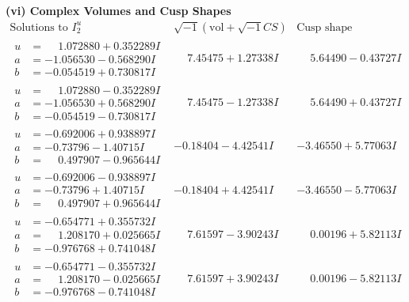 \documentclass[1p]{elsarticle_modified}
\theoremstyle{definition}
\newcommand{\I}{\sqrt{-1}}
\begin{document}
\newpage\flushleft \textbf{(vi) Complex Volumes and Cusp Shapes}
$$\begin{array}{c|c|c}  
\text{Solutions to }I^u_{2}& \I (\text{vol} + \sqrt{-1}CS) & \text{Cusp shape}\\
 \hline 
\begin{aligned}
u &= \phantom{-}1.072880 + 0.352289 I \\
a &= -1.056530 - 0.568290 I \\
b &= -0.054519 + 0.730817 I\end{aligned}
 & \phantom{-}7.45475 + 1.27338 I & \phantom{-}5.64490 - 0.43727 I \\ \hline\begin{aligned}
u &= \phantom{-}1.072880 - 0.352289 I \\
a &= -1.056530 + 0.568290 I \\
b &= -0.054519 - 0.730817 I\end{aligned}
 & \phantom{-}7.45475 - 1.27338 I & \phantom{-}5.64490 + 0.43727 I \\ \hline\begin{aligned}
u &= -0.692006 + 0.938897 I \\
a &= -0.73796 - 1.40715 I \\
b &= \phantom{-}0.497907 - 0.965644 I\end{aligned}
 & -0.18404 - 4.42541 I & -3.46550 + 5.77063 I \\ \hline\begin{aligned}
u &= -0.692006 - 0.938897 I \\
a &= -0.73796 + 1.40715 I \\
b &= \phantom{-}0.497907 + 0.965644 I\end{aligned}
 & -0.18404 + 4.42541 I & -3.46550 - 5.77063 I \\ \hline\begin{aligned}
u &= -0.654771 + 0.355732 I \\
a &= \phantom{-}1.208170 + 0.025665 I \\
b &= -0.976768 + 0.741048 I\end{aligned}
 & \phantom{-}7.61597 - 3.90243 I & \phantom{-}0.00196 + 5.82113 I \\ \hline\begin{aligned}
u &= -0.654771 - 0.355732 I \\
a &= \phantom{-}1.208170 - 0.025665 I \\
b &= -0.976768 - 0.741048 I\end{aligned}
 & \phantom{-}7.61597 + 3.90243 I & \phantom{-}0.00196 - 5.82113 I \\ \hline\begin{aligned}

\end{aligned}
\end{array}$$
\end{document}
